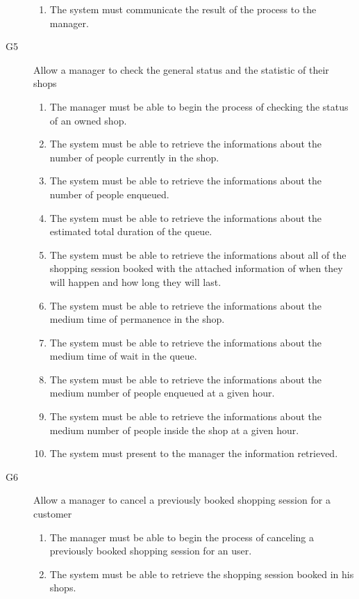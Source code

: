 \begin{description}
\begin{enumerate}[resume*]
            \item The system must communicate the result of the process to the manager. 
        \end{enumerate}
    \item [G5] Allow a manager to check the general status and the statistic of their shops
        \begin{enumerate}[resume*]
            \item The manager must be able to begin the process of checking the status of an owned shop.
            \item The system must be able to retrieve the informations about the number of people currently in the shop.
            \item The system must be able to retrieve the informations about the number of people enqueued.
            \item The system must be able to retrieve the informations about the estimated total duration of the queue.
            \item The system must be able to retrieve the informations about all of the shopping session booked with the attached information of when they will happen and how long they will last.
            \item The system must be able to retrieve the informations about the medium time of permanence in the shop. 
            \item The system must be able to retrieve the informations about the medium time of wait in the queue.
            \item The system must be able to retrieve the informations about the medium number of people enqueued at a given hour.
            \item The system must be able to retrieve the informations about the medium number of people inside the shop at a given hour.
            \item The system must present to the manager the information retrieved.
        \end{enumerate}
    \item [G6] Allow a manager to cancel a previously booked shopping session for a customer 
        \begin{enumerate}[resume*]
            \item The manager must be able to begin the process of canceling a previously booked shopping session for an user.
            \item The system must be able to retrieve the shopping session booked in his shops.

\end{enumerate}
\end{description}
